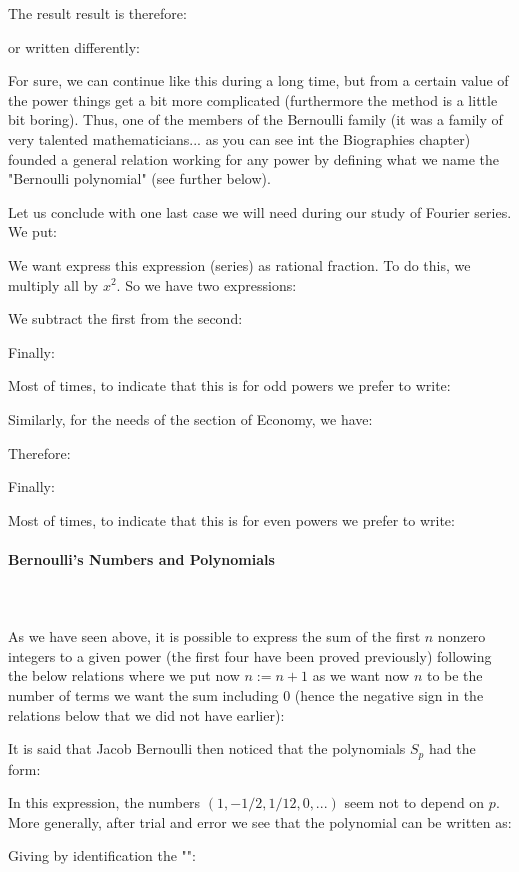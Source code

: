 	The result result is therefore:
	
	or written differently:
	
	For sure, we can continue like this during a long time, but from a certain value of the power things get a bit more complicated (furthermore the method is a little bit boring). Thus, one of the members of the Bernoulli family (it was a family of very talented mathematicians... as you can see int the Biographies chapter) founded a general relation working for any power by defining what we name the "Bernoulli polynomial" (see further below).
	
	Let us conclude with one last case we will need during our study of Fourier series. We put:
	
	We want express this expression (series) as rational fraction. To do this, we multiply all by $x^2$. So we have two expressions:
	
	We subtract the first from the second:
	
	Finally:
	
	Most of times, to indicate that this is for odd powers we prefer to write:
	
	Similarly, for the needs of the section of Economy, we have:
	
	Therefore:
	
	Finally:
	
	Most of times, to indicate that this is for even powers we prefer to write:
	
	\paragraph{Bernoulli's Numbers and Polynomials}\mbox{}\\\\
	As we have seen above, it is possible to express the sum of the first $n$ nonzero integers to a given power (the first four have been proved previously) following the below relations where we put now $n:=n+1$ as we want now $n$ to be the number of terms we want the sum including 0 (hence the negative sign in the relations below that we did not have earlier):
	
	It is said that Jacob Bernoulli then noticed that the polynomials $S_p$ had the form:
	
	In this expression, the numbers $(1,-1/2,1/12,0,...)$ seem not to depend on $p$. More generally, after trial and error we see that the polynomial can be written as:
	
	Giving by identification the "":
	
